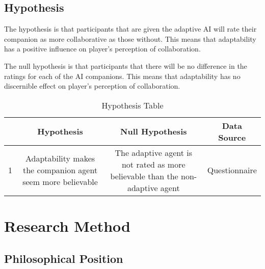 \documentclass{IEEEtran}
\begin{document}
\subsection{Hypothesis}
\label{Hypotheses}


The hypothesis is that participants that are given the adaptive AI will rate their companion as more collaborative as those without. This means that adaptability has a positive influence on player’s perception of collaboration.

The null hypothesis is that participants that there will be no difference in the ratings for each of the AI companions. This means that adaptability has no discernible effect on player’s perception of collaboration.


\begin{table}[h!]
  \begin{center}
    \caption{\newline{}Hypothesis Table}
    \label{tab:table1}
    \begin{tabular}{|c|c|c|c|}
      \textbf{ } & \textbf{Hypothesis} & \textbf{Null Hypothesis} & \textbf{Data Source}\\
      \hline
      1 & 
      Adaptability makes the companion agent seem more believable & 
      The adaptive agent is not rated as more believable than the non-adaptive agent &
      Questionnaire\\
    \end{tabular}
  \end{center}
\end{table}

\section{Research Method}
\label{ResearchMethod}

\subsection{Philosophical Position}
\label{PhilosophicalPosition}

\end{document}
